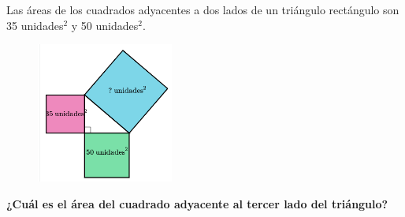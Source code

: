 \question[15]  Las áreas de los cuadrados adyacentes a dos lados de un triángulo
rectángulo son 35 unidades$^2$ y 50 unidades$^2$.
\begin{figure}[H]
    \begin{center}
        \includegraphics[width=0.4\textwidth]{../images/area4.png}
    \end{center}
    \caption{}
    \label{fig:area4}
\end{figure}
\textbf{¿Cuál es el área del cuadrado adyacente al tercer lado del triángulo?}